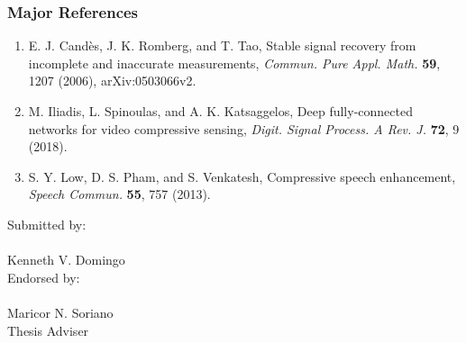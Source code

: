 \documentclass[10pt,oneside]{article}
\begin{document}
\subsubsection*{Major References}
\begin{enumerate}[(1)]
	\item E. J. Cand\`{e}s, J. K. Romberg, and T. Tao, Stable signal recovery from incomplete and inaccurate measurements, \textit{Commun. Pure Appl. Math.} \textbf{59}, 1207 (2006), arXiv:0503066v2.
	\item M. Iliadis, L. Spinoulas, and A. K. Katsaggelos, Deep fully-connected networks for video compressive sensing, \textit{Digit. Signal Process. A Rev. J.} \textbf{72}, 9 (2018).
	\item S. Y. Low, D. S. Pham, and S. Venkatesh, Compressive speech enhancement, \textit{Speech Commun.} \textbf{55}, 757 (2013).
\end{enumerate}

\medskip

Submitted by: \\
\smallskip \\
Kenneth V. Domingo \\

Endorsed by: \\
\smallskip \\
Maricor N. Soriano \\
Thesis Adviser
\end{document}
